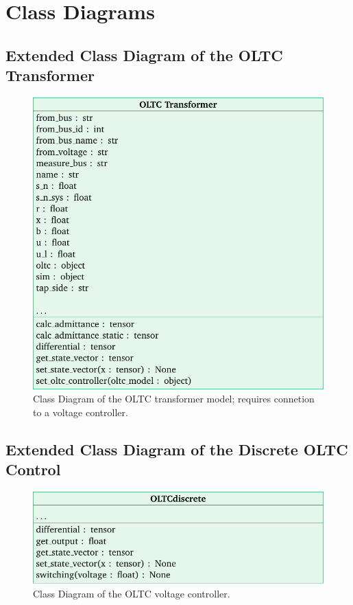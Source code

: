 \section{Class Diagrams}

\subsection{Extended Class Diagram of the OLTC Transformer}

\begin{figure}[H]
    \centering
    \includegraphics{tikz_graphics/images/class_diagram_oltc_transformer_complete.pdf}
    \caption{Class Diagram of the \acs{OLTC} transformer model; requires connetion to a voltage controller.}
\end{figure}

\subsection{Extended Class Diagram of the Discrete OLTC Control}

\begin{figure}[H]
    \centering
    \includegraphics{tikz_graphics/images/class_diagram_oltc_control.pdf}
    \caption{Class Diagram of the \acs{OLTC} voltage controller.}
\end{figure}

